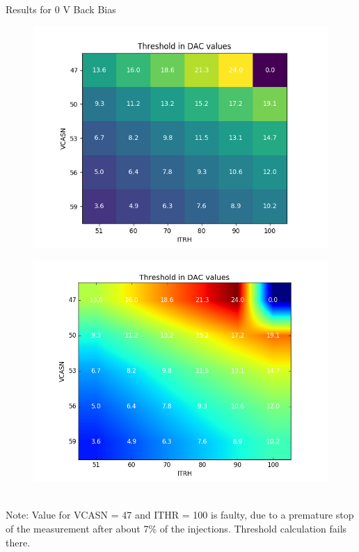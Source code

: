 \begin{frame}{Results for 0 V Back Bias}
    \begin{minipage}{.49\textwidth}
    \begin{figure}[H]
	\centering
	\includegraphics[width=\textwidth]{../bb0_Heatmap.png}
    \end{figure}
    \end{minipage}
    \begin{minipage}{.49\textwidth}
    \begin{figure}[H]
	\centering
	\includegraphics[width=\textwidth]{../bb0_Heatmap_soft.png}
    \end{figure}
    \end{minipage}\\[.5cm]
    \tiny
    Note: Value for VCASN = 47 and ITHR = 100 is faulty, due to a premature
    stop of the measurement after about 7\% of the injections.
    Threshold calculation fails there.
\end{frame}

